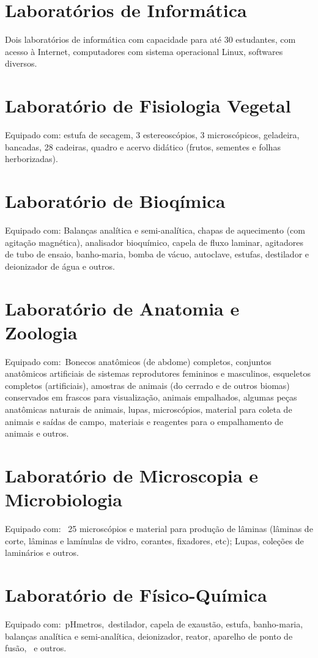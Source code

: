 \documentclass[11pt,fleqn]{book} %
\begin{document}
\section{Laboratórios de Informática}
Dois laboratórios de informática com capacidade para até 30 estudantes, com acesso à Internet, computadores com sistema operacional Linux, softwares diversos.


\section{Laboratório de Fisiologia Vegetal}
Equipado com: estufa de secagem, 3 estereoscópios, 3 microscópicos, geladeira, bancadas, 28 cadeiras, quadro e acervo didático (frutos, sementes e folhas herborizadas). 

\section{Laboratório de Bioqímica}
Equipado com: Balanças analítica e semi-analítica, chapas de aquecimento (com agitação magnética), analisador bioquímico, capela de fluxo laminar, agitadores de tubo de ensaio, banho-maria, bomba de vácuo, autoclave, estufas, destilador e deionizador de água e outros.

\section{Laboratório de Anatomia e Zoologia}
Equipado com: Bonecos anatômicos (de abdome) completos, conjuntos anatômicos artificiais de sistemas reprodutores femininos e masculinos, esqueletos completos (artificiais), amostras de animais (do cerrado e de outros biomas) conservados em frascos para visualização, animais empalhados, algumas peças anatômicas naturais de animais, lupas, microscópios, material para coleta de animais e saídas de campo, materiais e reagentes para o empalhamento de animais e outros.

\section{Laboratório de Microscopia e Microbiologia}
Equipado com:  25 microscópios e material para produção de lâminas (lâminas de corte, lâminas e lamínulas de vidro, corantes, fixadores, etc); Lupas, coleções de laminários e outros.

\section{Laboratório de Físico-Química}
Equipado com: pHmetros, destilador, capela de exaustão, estufa, banho-maria, balanças analítica e semi-analítica, deionizador, reator, aparelho de ponto de fusão,  e outros.
\end{document}
